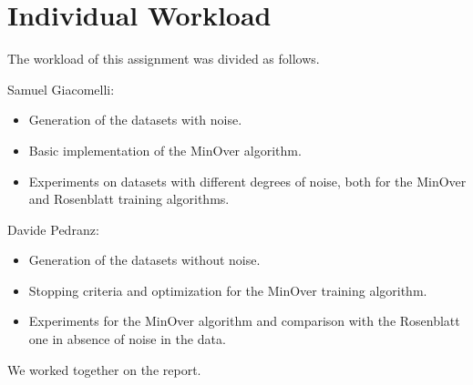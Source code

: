 \section{Individual Workload}
The workload of this assignment was divided as follows.

Samuel Giacomelli:
\begin{itemize}
    \item Generation of the datasets with noise.
    \item Basic implementation of the MinOver algorithm.
    \item Experiments on datasets with different degrees of noise, both for the MinOver and Rosenblatt training algorithms.
\end{itemize}

Davide Pedranz:
\begin{itemize}
    \item Generation of the datasets without noise.
    \item Stopping criteria and optimization for the MinOver training algorithm.
    \item Experiments for the MinOver algorithm and comparison with the Rosenblatt one in absence of noise in the data.
\end{itemize}

We worked together on the report.
